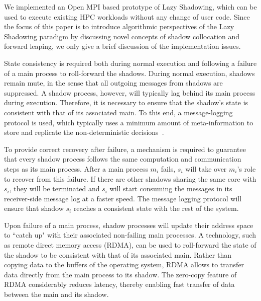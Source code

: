 %

We implemented an Open MPI based prototype of Lazy Shadowing, which can be used to execute existing HPC workloads without any change of user code. Since the focus of this paper is to introduce
algorithmic perspectives of the Lazy Shadowing paradigm by discussing novel concepts of shadow collocation and forward leaping, we only give a brief discussion of the implementation issues. 

State consistency is required both during normal execution and following a failure of a main process to roll-forward the shadows. During normal execution, shadows remain mute, in the sense that 
all outgoing messages from shadows are suppressed. 
A shadow process, however, will typically lag behind its main process during execution. Therefore, it is necessary to ensure that the shadow's state is consistent with that of its associated main. %
To this end, a message-logging protocol is used, %
which typically uses a minimum amount of meta-information to store and replicate the non-deterministic decisions~\cite{Marz}. %

To provide correct recovery after failure, 
a mechanism is required to guarantee that every shadow process follows the same computation and communication steps as its main process. 
After a main process $m_i$ fails, $s_i$ will take over $m_i$'s role to recover from this failure. If there are other shadows sharing the same core with $s_i$, they will be terminated and $s_i$ will start consuming the messages in its receiver-side message log at a faster speed. The message logging protocol will ensure that shadow $s_i$ reaches a consistent state with the rest of the system. 

Upon failure of a main process, shadow processes will update their address space to ``catch up" with their associated non-failing main processes. A technology, such as remote direct memory access (RDMA), can be used to roll-forward the state of the shadow to be consistent with that of its associated main. Rather than copying data to the buffers of the operating system, RDMA allows to transfer data directly from the main process to its shadow. The zero-copy feature of RDMA considerably reduces latency, thereby enabling fast transfer of data between the main and its shadow.

 


